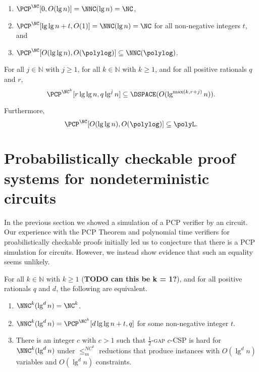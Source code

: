 \documentclass{article}
\begin{document}
\begin{corollary}\label{cor:pcpinnnc}
  \mbox{}
  \begin{enumerate}
  \item $\PCP^{\NC}[0, O(\lg n)] = \NNC(\lg n) = \NC$,
  \item $\PCP^{\NC}[\lg \lg n + t, O(1)] = \NNC(\lg n) = \NC$ for all non-negative integers $t$, and
  \item $\PCP^{\NC}[O(\lg \lg n), O(\polylog)] \subseteq \NNC(\polylog)$.
  \end{enumerate}
\end{corollary}

\begin{corollary}
  For all $j \in \mathbb{N}$ with $j \geq 1$, for all $k \in \mathbb{N}$ with $k \geq 1$, and for all positive rationals $q$ and $r$,
  \begin{equation*}
    \PCP^{\NC^k}[r \lg \lg n, q \lg^j n] \subseteq \DSPACE(O(\lg^{\max(k, r + j)} n)).
  \end{equation*}

  Furthermore,
  \begin{equation*}
    \PCP^{\NC}[O(\lg \lg n), O(\polylog)] \subseteq \polyL.
  \end{equation*}
\end{corollary}

\section{Probabilistically checkable proof systems for nondeterministic \texorpdfstring{\NC}{NC} circuits}\label{sec:pcpinnnc}

In the previous section we showed a simulation of a PCP verifier by an \NNC{} circuit.
Our experience with the PCP Theorem and polynomial time verifiers for proabilistically checkable proofs initially led us to conjecture that there is a PCP simulation for \NNC{} circuits.
However, we instead show evidence that such an equality seems unlikely.

\begin{theorem}\label{thm:equiv}
  For all $k \in \mathbb{N}$ with $k \geq 1$ (\textbf{TODO can this be k = 1?}), and for all positive rationals $q$ and $d$, the following are equivalent.
  \begin{enumerate}
  \item $\NNC^k(\lg^d n) = \NC^k$.
  \item $\NNC^k(\lg^d n) = \PCP^{\NC^k}[d \lg \lg n + t, q]$ for some non-negative integer $t$.
  \item There is an integer $c$ with $c > 1$ such that \textsc{$\frac{1}{2}$-gap $c$-CSP} is hard for $\NNC^k(\lg^d n)$ under $\leq_m^{NC^k}$ reductions that produce instances with $O(\lg^d n)$ variables and $O(\lg^d n)$ constraints.
  \end{enumerate}
\end{theorem}
\end{document}
